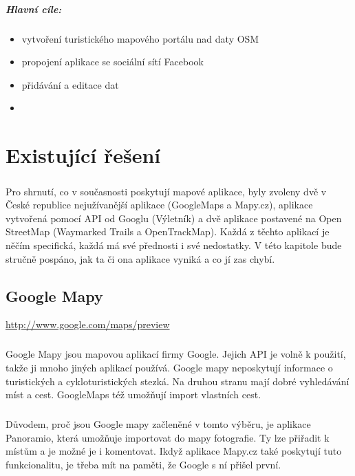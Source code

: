 \documentclass[11pt,a4paper,titlepage,oneside]{book}
\begin{document}
	\paragraph{Hlavní cíle:}
	\begin{itemize}
		\item vytvoření turistického mapového portálu nad daty OSM
		\item propojení aplikace se sociální sítí Facebook
		\item přidávání a editace dat
		\item 
	\end{itemize}



\pagestyle{fancy}


\chapter{Existující řešení}
	\paragraph{} Pro shrnutí, co v současnosti poskytují mapové aplikace, byly zvoleny dvě v České republice nejužívanější aplikace (GoogleMaps a Mapy.cz), aplikace vytvořená pomocí API od Googlu (Výletník) a dvě aplikace postavené na Open StreetMap (Waymarked Trails a OpenTrackMap). Každá z těchto aplikací je něčím specifická, každá má své přednosti i své nedostatky. V této kapitole bude stručně pospáno, jak ta či ona aplikace vyniká a co jí zas chybí.
	\section{Google Mapy}
		\url{http://www.google.com/maps/preview}
		\paragraph{}Google Mapy jsou mapovou aplikací firmy Google. Jejich API je volně k použití, takže ji mnoho jiných aplikací používá. Google mapy neposkytují informace o turistických a cykloturistických stezká. Na druhou stranu mají dobré vyhledávání míst a cest. GoogleMaps též umožňují import vlastních cest. 
		\paragraph{}Důvodem, proč jsou Google mapy začleněné v tomto výběru, je aplikace Panoramio, která umožňuje importovat do mapy fotografie. Ty lze přiřadit k místům a je možné je i komentovat. Ikdyž aplikace Mapy.cz  také poskytují tuto funkcionalitu, je třeba mít na paměti, že Google s ní přišel první.
\end{document}
